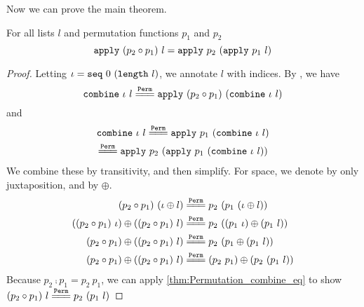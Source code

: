 \documentclass[sigplan,10pt,anonymous,review]{thesis}
\begin{document}
Now we can prove the main theorem.
\begin{theorem}
  For all lists $l$ and permutation functions $p_1$ and $p_2$
  \begin{equation*}
    \texttt{\textup{apply}}~(p_2 \circ p_1)~l = \texttt{\textup{apply}}~p_2~(\texttt{\textup{apply}}~p_1~l)
  \end{equation*}
\end{theorem}
\begin{proof}
  Letting $\iota = \texttt{\textup{seq}}~0~(\texttt{\textup{length}}~l)$, we annotate $l$ with
  indices. By , we have
  \begin{equation*}
    \var{combine}~\iota~l \eqperm \var{apply}~(p_2 \comp p_1)~(\var{combine}~\iota~l)
  \end{equation*}
  and
  \begin{gather*}
    \var{combine}~\iota~l
    \eqperm
    \var{apply}~p_1~(\var{combine}~\iota~l) \\
    \eqperm
    \var{apply}~p_2~(\var{apply}~p_1~(\var{combine}~\iota~l))
  \end{gather*}
  We combine these by transitivity, and then simplify. For space, we
  denote  by only juxtaposition, and  by $\oplus$.
  \begin{align*}
    (p_2 \comp p_1)~(\iota \oplus l)
    &\eqperm
    p_2~(p_1~(\iota \oplus l)) \\
    ((p_2 \comp p_1)~\iota) \oplus ((p_2 \comp p_1)~l)
    &\eqperm
    p_2~((p_1~\iota) \oplus (p_1~l)) \\
    (p_2 \comp p_1) \oplus ((p_2 \comp p_1)~l)
    &\eqperm
    p_2~(p_1 \oplus (p_1~l)) \\
    (p_2 \comp p_1) \oplus ((p_2 \comp p_1)~l)
    &\eqperm
    (p_2~p_1)\oplus(p_2~(p_1~l))
  \end{align*}
  Because $p_2 \comp p_1 = p_2~p_1$, we can apply
  \cref{thm:Permutation_combine_eq} to show $(p_2 \comp p_1)~l \eqperm
  p_2~(p_1~l)$
\end{proof}
\end{document}
